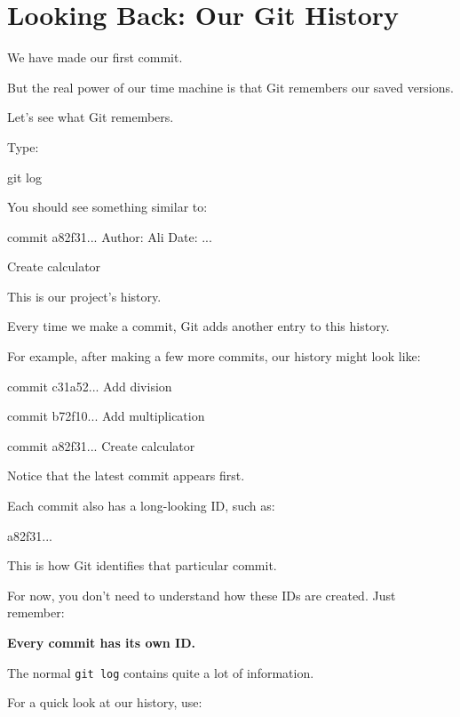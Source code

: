 \documentclass[11pt,a4paper]{article}
\begin{document}
\section{Looking Back: Our Git History}

We have made our first commit.

But the real power of our time machine is that Git remembers our saved versions.

Let's see what Git remembers.

Type:

\begin{code}
git log
\end{code}

You should see something similar to:

\begin{code}
commit a82f31...
Author: Ali
Date:   ...

    Create calculator
\end{code}

This is our project's history.

Every time we make a commit, Git adds another entry to this history.

For example, after making a few more commits, our history might look like:

\begin{code}
commit c31a52...
    Add division

commit b72f10...
    Add multiplication

commit a82f31...
    Create calculator
\end{code}

Notice that the latest commit appears first.

Each commit also has a long-looking ID, such as:

\begin{code}
a82f31...
\end{code}

This is how Git identifies that particular commit.

For now, you don't need to understand how these IDs are created. Just remember:

\begin{center}
\textbf{Every commit has its own ID.}
\end{center}

The normal \texttt{git log} contains quite a lot of information.

For a quick look at our history, use:
\end{document}
